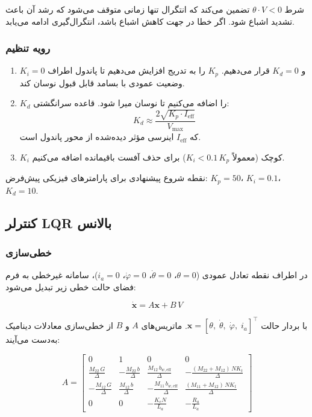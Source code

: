 شرط $\theta \cdot V < 0$ تضمین می‌کند که انتگرال تنها زمانی متوقف می‌شود که رشد آن باعث تشدید اشباع شود. اگر خطا در جهت کاهش اشباع باشد، انتگرال‌گیری ادامه می‌یابد.

\subsubsection{رویه تنظیم}

\begin{enumerate}[label=\arabic*.]
    \item $K_i = 0$ و $K_d = 0$ قرار می‌دهیم. $K_p$ را به تدریج افزایش می‌دهیم تا پاندول اطراف وضعیت عمودی با بسامد قابل قبول نوسان کند.
    \item $K_d$ را اضافه می‌کنیم تا نوسان میرا شود. قاعده سرانگشتی:
    \begin{equation}
    K_d \approx \frac{2\sqrt{K_p \cdot I_{\text{eff}}}}{V_{\max}}
    \end{equation}
    که $I_{\text{eff}}$ اینرسی مؤثر دیده‌شده از محور پاندول است.
    \item $K_i$ کوچک (معمولاً $K_i < 0.1\,K_p$) برای حذف آفست باقیمانده اضافه می‌کنیم.
\end{enumerate}

نقطه شروع پیشنهادی برای پارامترهای فیزیکی پیش‌فرض: $K_p = 50$، $K_i = 0.1$، $K_d = 10$.


\subsection{کنترلر LQR بالانس}

\subsubsection{خطی‌سازی}

در اطراف نقطه تعادل عمودی ($\theta = 0$، $\dot\theta = 0$، $\dot\varphi = 0$، $i_a = 0$)، سامانه غیرخطی به فرم فضای حالت خطی زیر تبدیل می‌شود:

\begin{equation}
\dot{\mathbf{x}} = A\mathbf{x} + B\,V
\end{equation}

با بردار حالت $\mathbf{x} = [\theta,\;\dot\theta,\;\dot\varphi,\;i_a]^\top$. ماتریس‌های $A$ و $B$ از خطی‌سازی معادلات دینامیک به‌دست می‌آیند:

\begin{equation}
A = \begin{bmatrix}
0 & 1 & 0 & 0 \\
\frac{M_{22}\,G}{\Delta} & -\frac{M_{22}\,b}{\Delta} & \frac{M_{12}\,b_{w,\text{eff}}}{\Delta} & -\frac{(M_{22}+M_{12})\,N K_t}{\Delta} \\
-\frac{M_{12}\,G}{\Delta} & \frac{M_{12}\,b}{\Delta} & -\frac{M_{11}\,b_{w,\text{eff}}}{\Delta} & \frac{(M_{11}+M_{12})\,N K_t}{\Delta} \\
0 & 0 & -\frac{K_e N}{L_a} & -\frac{R_a}{L_a}
\end{bmatrix}
\end{equation}

